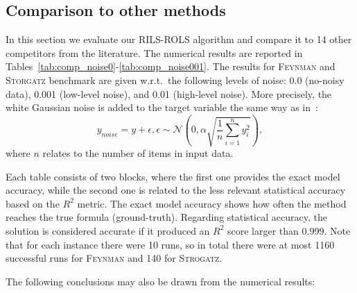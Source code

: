 \documentclass{bmcart}
\begin{document}
\subsection{Comparison to other methods}
In this section we evaluate our \textsc{RILS-ROLS} algorithm and compare it to 14 other competitors from the literature. The numerical results are reported in Tables~\ref{tab:comp_noise0}-\ref{tab:comp_noise001}. The results for \textsc{Feynman} and \textsc{Storgatz} benchmark are given w.r.t.\  the following levels of noise: 0.0 (no-noisy data), 0.001 (low-level noise), and 0.01 (high-level noise). More precisely, the white Gaussian noise is added to the target variable the same way as in~\cite{la2021contemporary}:
$$ y_{noise} = y + \epsilon, \epsilon \sim \mathcal{N}\left(0, \alpha \sqrt{\frac{1}{n} \sum _{i=1}^n{y_i^2}}\right),$$
where $n$ relates to the number of items in input data.

Each table consists of two blocks, where the first one provides the exact model accuracy, while the second one is related to the less relevant statistical accuracy based on the $R^2$ metric. The exact model accuracy shows how often the method reaches the true formula (ground-truth). Regarding statistical accuracy, the solution is considered accurate if it produced an $R^2$ score larger than 0.999.  Note that for each instance there were 10 runs, so in total there were at most 1160 successful runs for \textsc{Feynman} and 140 for \textsc{Strogatz}.  

The following conclusions may also be drawn from the numerical results: 
\end{document}
